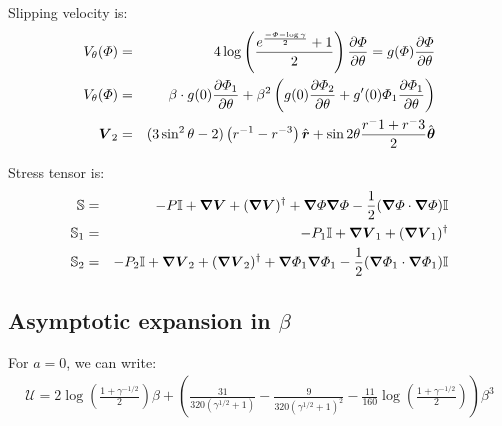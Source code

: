 Slipping velocity is:
\begin{eqnarray}
V_\theta(\varPhi) &=& 4\log\left(\frac{e^\frac{-\varPhi-\log\gamma}{2}+1}{2}\right)\frac{\partial \varPhi}{\partial \theta} 
= g(\varPhi) \frac{\partial \varPhi}{\partial \theta} 
\\
V_\theta(\varPhi) &=& \beta \cdot g(0) \frac{\partial \varPhi_1}{\partial \theta} +
\beta^2 \left(g(0) \frac{\partial \varPhi_2}{\partial \theta} + g'(0) \varPhi_1 \frac{\partial \varPhi_1}{\partial \theta}\right)
\\
\boldsymbol{V}_2 &=& (3\sin^2\theta - 2)\left(r^{-1} - r^{-3}\right) \hat{\boldsymbol{r}} + \sin2\theta\frac{r^-1+r^-3}{2}\hat{\boldsymbol{\theta}}
\end{eqnarray}

Stress tensor is:
\begin{eqnarray}
  \mathbb{S} &=& -P \mathbb{I} + \boldsymbol{\nabla} \boldsymbol{V} + (\boldsymbol{\nabla} \boldsymbol{V})^\dagger +
  \boldsymbol{\nabla} \varPhi \boldsymbol{\nabla} \varPhi - \frac{1}{2} (\boldsymbol{\nabla} \varPhi \cdot \boldsymbol{\nabla} \varPhi) \mathbb{I}
  \\
  \mathbb{S}_1 &=& -P_1 \mathbb{I} + \boldsymbol{\nabla} \boldsymbol{V}_1 + (\boldsymbol{\nabla} \boldsymbol{V}_1)^\dagger
  \\
  \mathbb{S}_2 &=& -P_2 \mathbb{I} + \boldsymbol{\nabla} \boldsymbol{V}_2 + (\boldsymbol{\nabla} \boldsymbol{V}_2)^\dagger + \boldsymbol{\nabla} \varPhi_1 \boldsymbol{\nabla} \varPhi_1 - \frac{1}{2} (\boldsymbol{\nabla} \varPhi_1 \cdot \boldsymbol{\nabla} \varPhi_1) \mathbb{I}
\end{eqnarray} 

\subsection{Asymptotic expansion in $\beta$}
For $a=0$, we can write:
\begin{eqnarray}
\mathcal{U} = 2\log\left(\frac{1+\gamma^{-1/2}}{2}\right)\beta 
       + \left(\frac{31}{320\left(\gamma^{1/2}+1\right)} 
       - \frac{9}{320\left(\gamma^{1/2}+1\right)^2} 
       - \frac{11}{160}\log\left(\frac{1+\gamma^{-1/2}}{2}\right)\right)\beta^3
\end{eqnarray} 

